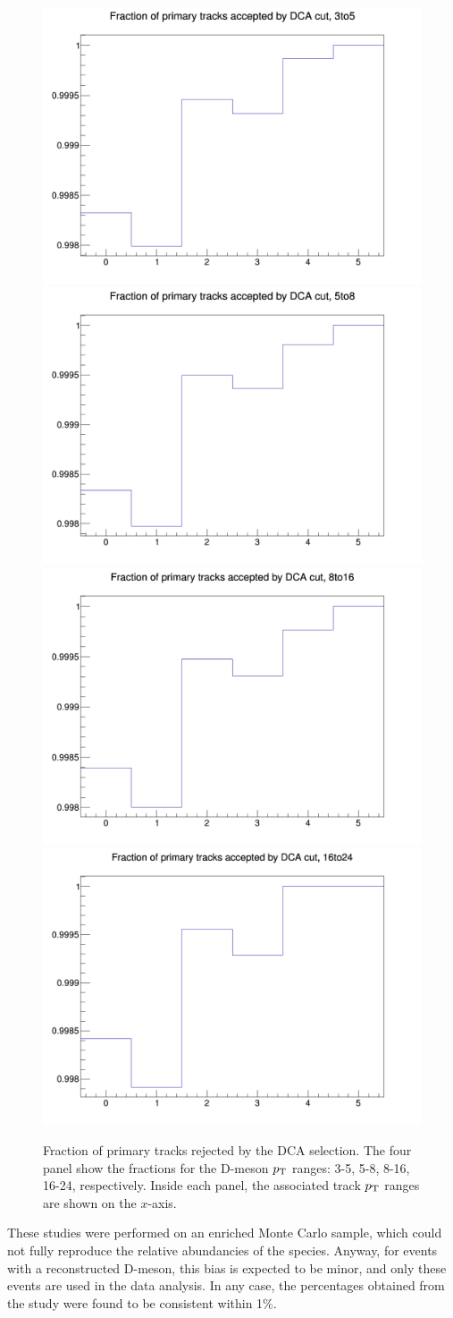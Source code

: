 \begin{figure}[h]   %
	\centering
	\includegraphics[width=.48\linewidth]{figures/SecTracks/FractOfPrimAccepted_3to5.png}
	\includegraphics[width=.48\linewidth]{figures/SecTracks/FractOfPrimAccepted_5to8.png}
    \includegraphics[width=.48\linewidth]{figures/SecTracks/FractOfPrimAccepted_8to16.png}
    \includegraphics[width=.48\linewidth]{figures/SecTracks/FractOfPrimAccepted_16to24.png}
	\caption{Fraction of primary tracks rejected by the DCA selection. The four panel show the fractions for the D-meson $p_{\rm T}$ ranges: 3-5, 5-8, 8-16, 16-24, respectively. Inside each panel, the associated track $p_{\rm T}$ ranges are shown on the $x$-axis.}
		\label{fig:primRej}	
\end{figure}

These studies were performed on an enriched Monte Carlo sample, which could not fully reproduce the relative abundancies of the species. Anyway, for events with a reconstructed D-meson, this bias is expected to be minor, and only these events are used in the data analysis. In any case, the percentages obtained from the study were found to be consistent within 1\%.

\clearpage
%
